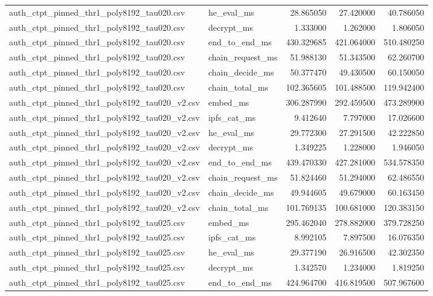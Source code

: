 \begin{tabular}{llrrr}
auth_ctpt_pinned_thr1_poly8192_tau020.csv & he_eval_ms & 28.865050 & 27.420000 & 40.786050 \\
auth_ctpt_pinned_thr1_poly8192_tau020.csv & decrypt_ms & 1.333000 & 1.262000 & 1.806050 \\
auth_ctpt_pinned_thr1_poly8192_tau020.csv & end_to_end_ms & 430.329685 & 421.064000 & 510.480250 \\
auth_ctpt_pinned_thr1_poly8192_tau020.csv & chain_request_ms & 51.988130 & 51.343500 & 62.260700 \\
auth_ctpt_pinned_thr1_poly8192_tau020.csv & chain_decide_ms & 50.377470 & 49.430500 & 60.150050 \\
auth_ctpt_pinned_thr1_poly8192_tau020.csv & chain_total_ms & 102.365605 & 101.488500 & 119.942400 \\
auth_ctpt_pinned_thr1_poly8192_tau020_v2.csv & embed_ms & 306.287990 & 292.459500 & 473.289900 \\
auth_ctpt_pinned_thr1_poly8192_tau020_v2.csv & ipfs_cat_ms & 9.412640 & 7.797000 & 17.026600 \\
auth_ctpt_pinned_thr1_poly8192_tau020_v2.csv & he_eval_ms & 29.772300 & 27.291500 & 42.222850 \\
auth_ctpt_pinned_thr1_poly8192_tau020_v2.csv & decrypt_ms & 1.349225 & 1.228000 & 1.946050 \\
auth_ctpt_pinned_thr1_poly8192_tau020_v2.csv & end_to_end_ms & 439.470330 & 427.281000 & 534.578350 \\
auth_ctpt_pinned_thr1_poly8192_tau020_v2.csv & chain_request_ms & 51.824460 & 51.294000 & 62.486550 \\
auth_ctpt_pinned_thr1_poly8192_tau020_v2.csv & chain_decide_ms & 49.944605 & 49.679000 & 60.163450 \\
auth_ctpt_pinned_thr1_poly8192_tau020_v2.csv & chain_total_ms & 101.769135 & 100.681000 & 120.383150 \\
auth_ctpt_pinned_thr1_poly8192_tau025.csv & embed_ms & 295.462040 & 278.882000 & 379.728250 \\
auth_ctpt_pinned_thr1_poly8192_tau025.csv & ipfs_cat_ms & 8.992105 & 7.897500 & 16.076350 \\
auth_ctpt_pinned_thr1_poly8192_tau025.csv & he_eval_ms & 29.377190 & 26.916500 & 42.302350 \\
auth_ctpt_pinned_thr1_poly8192_tau025.csv & decrypt_ms & 1.342570 & 1.234000 & 1.819250 \\
auth_ctpt_pinned_thr1_poly8192_tau025.csv & end_to_end_ms & 424.964700 & 416.819500 & 507.967600 \\

\end{tabular}
